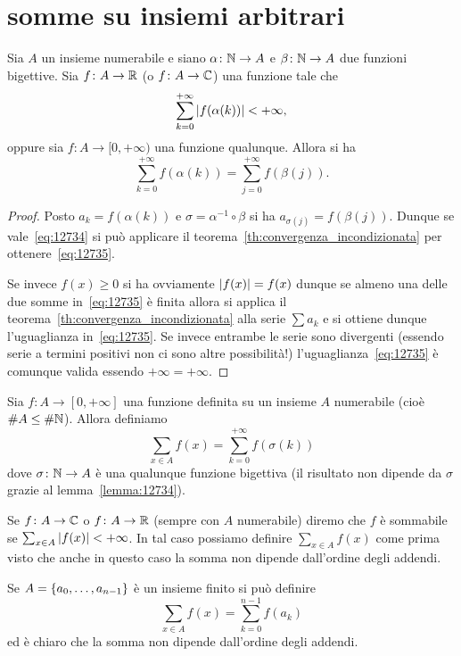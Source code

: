 \section{somme su insiemi arbitrari}
%
%

\begin{lemma}\label{lemma:12734}
  Sia $A$ un insieme numerabile e siano 
  $\alpha\colon {\mathbb N}\to A$ e $\beta\colon {\mathbb N}\to A$ 
  due funzioni bigettive.
  Sia $f\colon A\to {\mathbb R}$ (o 
  $f\colon A \to {\mathbb C}$) una funzione tale che 
  \begin{equation}\label{eq:12734}
    \sum_{k=0}^{+\infty} {\left|f(\alpha(k))\right|} < +\infty,  
  \end{equation}
  oppure sia $f\colon A\to [0,+\infty)$ una funzione 
  qualunque. 
  Allora si ha
  \begin{equation}\label{eq:12735}
    \sum_{k=0}^{+\infty} f(\alpha(k)) =
    \sum_{j=0}^{+\infty} f(\beta(j)). 
  \end{equation}
\end{lemma}
%
\begin{proof}
Posto $a_k=f(\alpha (k))$ e $\sigma = \alpha^{-1}\circ \beta$ si ha 
$a_{\sigma(j)} = f(\beta (j))$.
Dunque se vale~\eqref{eq:12734} si può 
applicare il teorema~\ref{th:convergenza_incondizionata}
per ottenere~\eqref{eq:12735}.

Se invece $f(x)\ge 0$ si ha ovviamente ${\left|f(x)\right|}=f(x)$
dunque se almeno una delle due somme in~\eqref{eq:12735}
è finita allora si applica il teorema~\ref{th:convergenza_incondizionata}
alla serie $\sum a_k$ e si ottiene dunque l'uguaglianza 
in~\eqref{eq:12735}.
Se invece entrambe le serie sono divergenti
(essendo serie a termini positivi non ci sono altre possibilità!)
l'uguaglianza~\eqref{eq:12735} è comunque valida
essendo $+\infty = +\infty$.
\end{proof}

\begin{definition}
Sia $f\colon A\to [0,+\infty]$ una funzione definita su un insieme 
$A$ numerabile (cioè $\#A \le \#{\mathbb N}$).
Allora definiamo
  \[
    \sum_{x\in A}f(x)
    = \sum_{k=0}^{+\infty} f(\sigma(k)) 
  \]
dove $\sigma\colon {\mathbb N}\to A$ è una qualunque funzione bigettiva
(il risultato non dipende da $\sigma$ grazie al lemma~\ref{lemma:12734}).

Se $f\colon A\to {\mathbb C}$ o $f\colon A\to {\mathbb R}$ (sempre con $A$ numerabile)
diremo che $f$ è sommabile se $\sum_{x\in A}{\left|f(x)\right|}<+\infty$. 
In tal caso possiamo definire $\sum_{x\in A} f(x)$ come prima
visto che anche in questo caso la somma non dipende
dall'ordine degli addendi.

Se $A={\left\{ a_0, \dots, a_{n-1} \right\}}$ è un insieme finito si può definire 
\[
  \sum_{x\in A} f(x) = \sum_{k=0}^{n-1} f(a_k)
\]
ed è chiaro che la somma non dipende dall'ordine degli addendi.
\end{definition}

